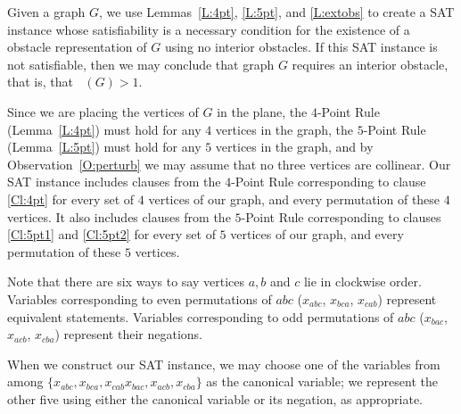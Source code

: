 \documentclass[12pt]{amsart}
\theoremstyle{remark}
\DeclareMathOperator{\obs}{\ensuremath{\mathrm{obs}}}
\DeclareMathOperator{\obsout}{\ensuremath{\obs_\mathrm{out}}}
\begin{document}
Given a graph $G$,
we use Lemmas~\ref{L:4pt}, \ref{L:5pt}, and \ref{L:extobs}
to create a SAT instance
whose satisfiability is a necessary condition for the
existence of a obstacle representation of $G$
using no interior obstacles.
If this SAT instance is not satisfiable,
then we may conclude that graph $G$ requires an interior obstacle,
that is, that $\obsout(G) > 1$.

Since we are placing the vertices of $G$ in the plane,
the $4$-Point Rule (Lemma~\ref{L:4pt})
must hold for any $4$ vertices in the graph,
the $5$-Point Rule (Lemma~\ref{L:5pt})
must hold for any $5$ vertices in the graph,
and by Observation~\ref{O:perturb}
we may assume that no three vertices are collinear.
%
Our SAT instance includes clauses from the $4$-Point Rule corresponding to clause \eqref{Cl:4pt}
for every set of $4$ vertices of our graph,
and every permutation of these $4$ vertices.
It also includes clauses from the $5$-Point Rule corresponding to clauses \eqref{Cl:5pt1} and \eqref{Cl:5pt2}
for every set of $5$ vertices of our graph,
and every permutation of these $5$ vertices.

Note that there are six ways to say vertices $a, b$ and $c$
lie in clockwise order.
Variables corresponding to even permutations of $abc$
($x_{abc}$, $x_{bca}$, $x_{cab}$)
represent equivalent statements.
Variables corresponding to
odd permutations of $abc$
($x_{bac}$, $x_{acb}$, $x_{cba}$)
represent their negations.

When we construct our SAT instance,
we may choose one of the variables from among $\{x_{abc}, x_{bca}, x_{cab} x_{bac}, x_{acb}, x_{cba}\}$ as the canonical variable;
we represent the other five using either the canonical
variable or its negation, as appropriate.
\end{document}
